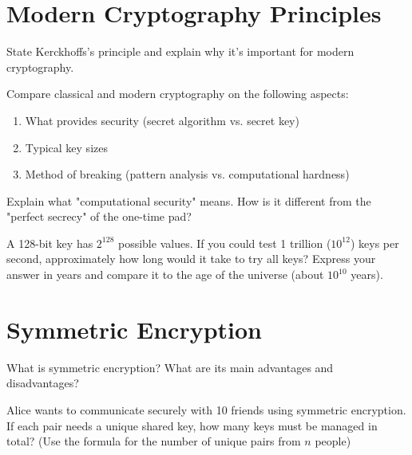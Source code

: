 \documentclass[11pt,a4paper]{report}
\begin{document}
\section{Modern Cryptography Principles}

\begin{ex}
State Kerckhoffs's principle and explain why it's important for modern cryptography.
\end{ex}

\begin{ex}
Compare classical and modern cryptography on the following aspects:
\begin{enumerate}[label=\alph*)]
    \item What provides security (secret algorithm vs. secret key)
    \item Typical key sizes
    \item Method of breaking (pattern analysis vs. computational hardness)
\end{enumerate}
\end{ex}

\begin{ex}
Explain what "computational security" means. How is it different from the "perfect secrecy" of the one-time pad?
\end{ex}

\begin{ex}
A 128-bit key has $2^{128}$ possible values. If you could test 1 trillion ($10^{12}$) keys per second, approximately how long would it take to try all keys? Express your answer in years and compare it to the age of the universe (about $10^{10}$ years).
\end{ex}

\section{Symmetric Encryption}

\begin{ex}
What is symmetric encryption? What are its main advantages and disadvantages?
\end{ex}

\begin{ex}
Alice wants to communicate securely with 10 friends using symmetric encryption. If each pair needs a unique shared key, how many keys must be managed in total? (Use the formula for the number of unique pairs from $n$ people)
\end{ex}
\end{document}
